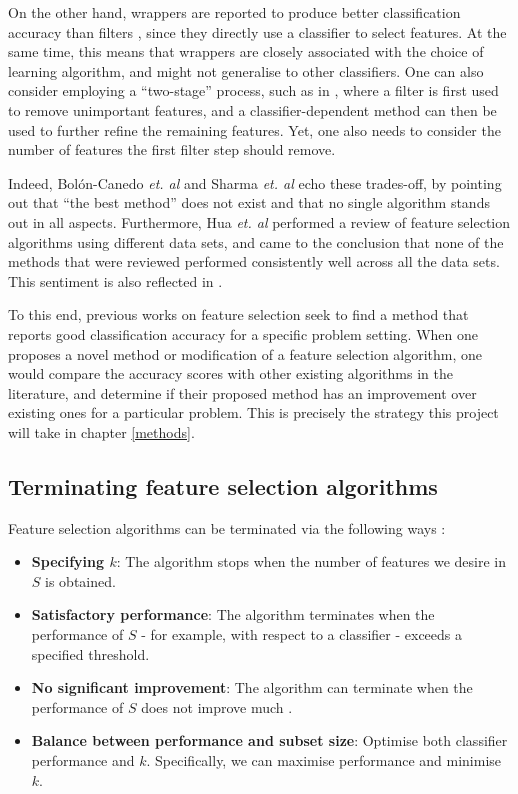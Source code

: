 \documentclass[12pt, twoside, a4paper]{report}
\begin{document}
On the other hand, wrappers are reported to produce better classification accuracy than filters \cite{RefWorks:163}, since they directly use a classifier to select features. At the same time, this means that wrappers are closely associated with the choice of learning algorithm, and might not generalise to other classifiers. One can also consider employing a ``two-stage'' process, such as in \cite{RefWorks:216}, where a filter is first used to remove unimportant features, and a classifier-dependent method can then be used to further refine the remaining features. Yet, one also needs to consider the number of features the first filter step should remove.

Indeed, Bolón-Canedo \textit{et. al} \cite{RefWorks:163} and Sharma \textit{et. al} \cite{RefWorks:215} echo these trades-off, by pointing out that ``the best method'' does not exist and that no single algorithm stands out in all aspects. Furthermore, Hua \textit{et. al} \cite{RefWorks:216} performed a review of feature selection algorithms using different data sets, and came to the conclusion that none of the methods that were reviewed performed consistently well across all the data sets. This sentiment is also reflected in \cite{RefWorks:217}.

To this end, previous works on feature selection seek to find a method that reports good classification accuracy for a specific problem setting. When one proposes a novel method or modification of a feature selection algorithm, one would compare the accuracy scores with other existing algorithms in the literature, and determine if their proposed method has an improvement over existing ones for a particular problem. This is precisely the strategy this project will take in chapter \ref{methods}.

\subsection{Terminating feature selection algorithms} \label{bg:fs:terminating}

Feature selection algorithms can be terminated via the following ways \cite{RefWorks:210}:
\begin{itemize}
  \item \textbf{Specifying $k$}: The algorithm stops when the number of features we desire in $S$ is obtained.
  \item \textbf{Satisfactory performance}: The algorithm terminates when the performance of $S$ - for example, with respect to a classifier - exceeds a specified threshold.
  \item \textbf{No significant improvement}: The algorithm can terminate when the performance of $S$ does not improve much \cite{RefWorks:215}.
  \item \textbf{Balance between performance and subset size}: Optimise both classifier performance and $k$. Specifically, we can maximise performance and minimise $k$.
\end{itemize}
\end{document}
